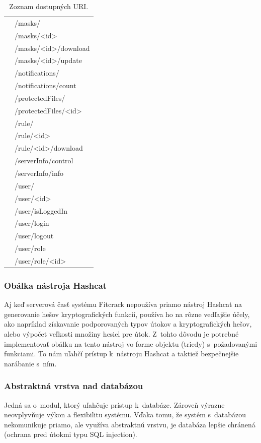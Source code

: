 \documentclass[slovak]{fitthesis}
\begin{document}
\begin{table}[h]
\begin{center}
\begin{tabular}{ |p{8cm}|p{7.4cm}|  }
           & /masks/ \\
           & /masks/<id> \\
           & /masks/<id>/download \\
           & /masks/<id>/update \\
           & /notifications/ \\
           & /notifications/count \\
           & /protectedFiles/ \\
           & /protectedFiles/<id> \\
           & /rule/ \\
           & /rule/<id> \\
           & /rule/<id>/download \\
           & /serverInfo/control \\
           & /serverInfo/info \\
           & /user/ \\
           & /user/<id> \\
           & /user/isLoggedIn \\
           & /user/login \\
           & /user/logout \\
           & /user/role \\
           & /user/role/<id> \\
         \hline
        \end{tabular}
      \caption{Zoznam dostupných URI.}
      \label{zoznamURItable}
  \end{center}
\end{table}

\subsubsection{Obálka nástroja Hashcat}
Aj keď serverová časť systému Fitcrack nepoužíva priamo nástroj Hashcat na generovanie hešov kryptografických funkcií, používa ho na rôzne vedľajšie účely, ako napríklad získavanie podporovaných typov útokov a kryptografických hešov, alebo výpočet veľkosti množiny hesiel pre útok. Z~tohto dôvodu je potrebné implementovať obálku na tento nástroj vo forme objektu (triedy) s~požadovanými funkciami. To nám uľahčí prístup k~nástroju Hashcat a taktiež bezpečnejšie narábanie s~ním.

\subsubsection{Abstraktná vrstva nad databázou}
Jedná sa o~modul, ktorý uľahčuje prístup k~databáze. Zároveň výrazne neovplyvňuje výkon a flexibilitu systému. Vďaka tomu, že systém s~databázou nekomunikuje priamo, ale využíva abstraktnú vrstvu, je databáza lepšie chránená (ochrana pred útokmi typu SQL injection).
\end{document}
